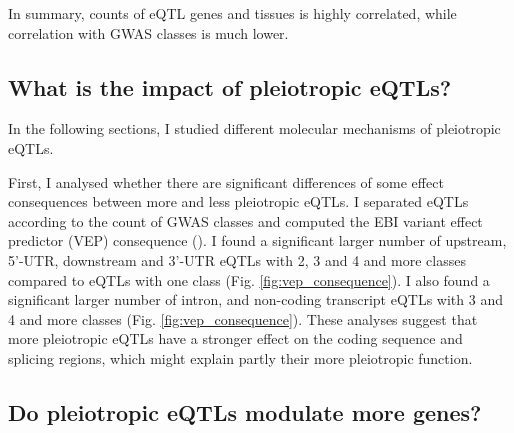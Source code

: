 In summary, counts of eQTL genes and tissues is highly correlated, while correlation with GWAS classes is much lower.

%
\subsection*{What is the impact of pleiotropic eQTLs?}
%


In the following sections, I studied different molecular mechanisms of pleiotropic eQTLs.
%

First, I analysed whether there are significant differences of some effect consequences between more and less pleiotropic eQTLs.
%
I separated eQTLs according to the count of GWAS classes and computed the EBI variant effect predictor (VEP) consequence (\cite{2016.Cunningham.McLaren}).
%
I found a significant larger number of upstream, 5'-UTR, downstream and 3'-UTR eQTLs
with 2, 3 and 4 and more classes compared to eQTLs with one class (Fig. \ref{fig:vep_consequence}).
%
I also found a significant larger number of intron, and non-coding transcript eQTLs
with 3 and 4 and more classes (Fig. \ref{fig:vep_consequence}).
%
These analyses suggest that more pleiotropic eQTLs have a stronger effect on
the coding sequence and splicing regions, which might explain partly their more pleiotropic function.

%
\subsection*{Do pleiotropic eQTLs modulate more genes?}
%

